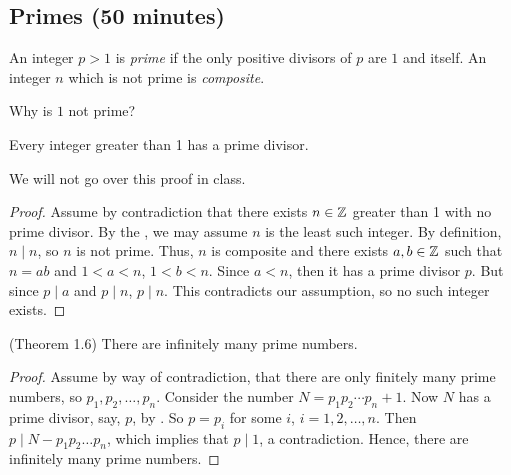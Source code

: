 \documentclass{../ximera}
\begin{document}
\subsection{Primes (50 minutes)}
\begin{defn}
An integer $p>1$ is \emph{prime} if the only positive divisors of $p$ are $1$ and itself. An integer $n$ which is not prime is \emph{composite}. 
\end{defn}

Why is $1$ not prime?


\begin{lem*}[Lemma 1.5]\label{lem:prime-composite}
 Every integer greater than 1 has a prime divisor.
\end{lem*}

We will not go over this proof in class.

\begin{proof} 
 Assume by contradiction that there exists $n\in\mathbb Z$ greater than 1 with no prime divisor. By the , we may assume $n$ is the least such integer. By definition, $n\mid n$, so $n$ is not prime. Thus, $n$ is composite and there exists $a,b\in\mathbb Z$ such that $n=ab$ and $1<a<n$, $1<b<n$. Since $a<n$, then it has a prime divisor $p$. But since $p\mid a$ and $p\mid n$, $p\mid n$. This contradicts our assumption, so no such integer exists.
\end{proof}


\begin{thm*}\label{thm:inf-primes}(Theorem 1.6)
 There are infinitely many prime numbers.
\end{thm*}
\begin{proof}
 Assume by way of contradiction, that there are only finitely many prime numbers, so $p_1,p_2,\dots,p_n$. Consider the number $N=p_1p_2\cdots p_n +1$. Now $N$ has a prime divisor, say, $p$, by . So $p=p_i$ for some $i$, $i=1,2,\dots,n$. Then $p\mid N-p_1p_2\dots p_n$, which implies that $p\mid 1$, a contradiction. Hence, there are infinitely many prime numbers.
\end{proof}
\end{document}
